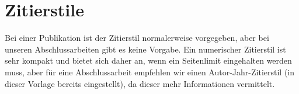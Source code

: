 \section{Zitierstile}
Bei einer Publikation ist der Zitierstil normalerweise vorgegeben, aber bei unseren Abschlussarbeiten gibt es keine Vorgabe.
Ein numerischer Zitierstil ist sehr kompakt und bietet sich daher an, wenn ein Seitenlimit eingehalten werden muss, aber für eine Abschlussarbeit empfehlen wir einen Autor-Jahr-Zitierstil (in dieser Vorlage bereits eingestellt), da dieser mehr Informationen vermittelt.
